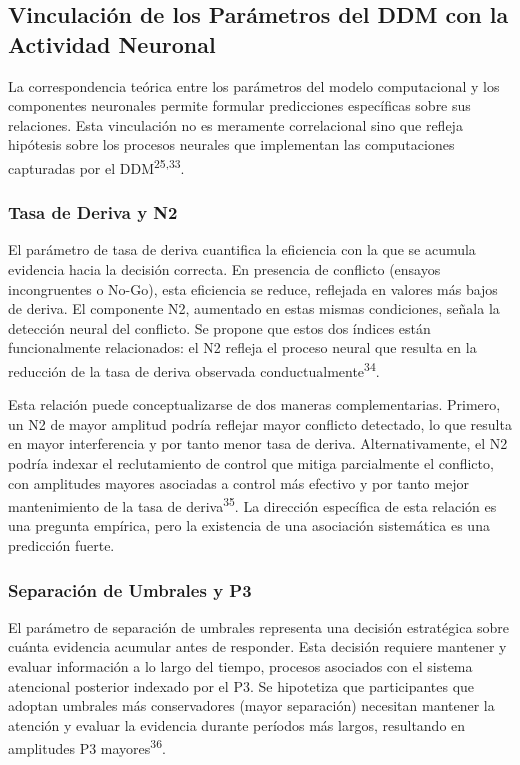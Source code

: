 \documentclass[
  spanish,
  10pt,
]{article}
\begin{document}
\subsection{Vinculación de los Parámetros del DDM con la Actividad
Neuronal}\label{vinculaciuxf3n-de-los-paruxe1metros-del-ddm-con-la-actividad-neuronal}

La correspondencia teórica entre los parámetros del modelo computacional
y los componentes neuronales permite formular predicciones específicas
sobre sus relaciones. Esta vinculación no es meramente correlacional
sino que refleja hipótesis sobre los procesos neurales que implementan
las computaciones capturadas por el DDM\textsuperscript{25,33}.

\subsubsection{Tasa de Deriva y N2}\label{tasa-de-deriva-y-n2}

El parámetro de tasa de deriva cuantifica la eficiencia con la que se
acumula evidencia hacia la decisión correcta. En presencia de conflicto
(ensayos incongruentes o No-Go), esta eficiencia se reduce, reflejada en
valores más bajos de deriva. El componente N2, aumentado en estas mismas
condiciones, señala la detección neural del conflicto. Se propone que
estos dos índices están funcionalmente relacionados: el N2 refleja el
proceso neural que resulta en la reducción de la tasa de deriva
observada conductualmente\textsuperscript{34}.

Esta relación puede conceptualizarse de dos maneras complementarias.
Primero, un N2 de mayor amplitud podría reflejar mayor conflicto
detectado, lo que resulta en mayor interferencia y por tanto menor tasa
de deriva. Alternativamente, el N2 podría indexar el reclutamiento de
control que mitiga parcialmente el conflicto, con amplitudes mayores
asociadas a control más efectivo y por tanto mejor mantenimiento de la
tasa de deriva\textsuperscript{35}. La dirección específica de esta
relación es una pregunta empírica, pero la existencia de una asociación
sistemática es una predicción fuerte.

\subsubsection{Separación de Umbrales y
P3}\label{separaciuxf3n-de-umbrales-y-p3}

El parámetro de separación de umbrales representa una decisión
estratégica sobre cuánta evidencia acumular antes de responder. Esta
decisión requiere mantener y evaluar información a lo largo del tiempo,
procesos asociados con el sistema atencional posterior indexado por el
P3. Se hipotetiza que participantes que adoptan umbrales más
conservadores (mayor separación) necesitan mantener la atención y
evaluar la evidencia durante períodos más largos, resultando en
amplitudes P3 mayores\textsuperscript{36}.
\end{document}
